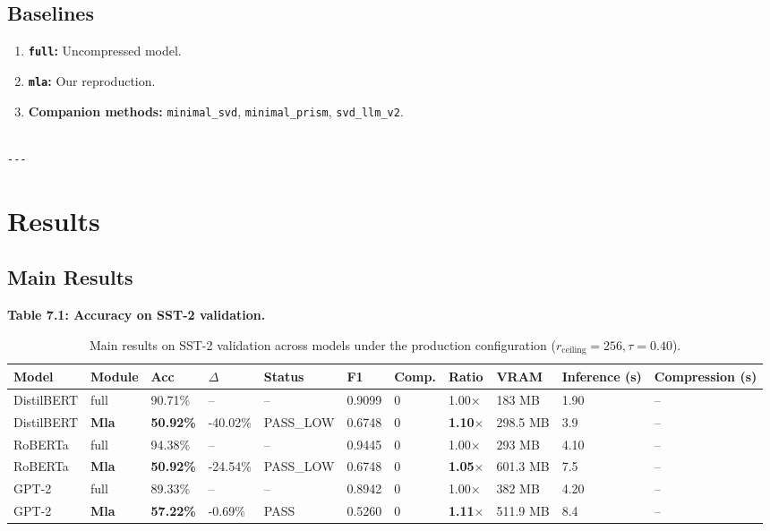 \subsection{Baselines}

\begin{enumerate}
\item \textbf{\texttt{full}:} Uncompressed model.
\item \textbf{\texttt{mla}:} Our reproduction.
\item \textbf{Companion methods:} \texttt{minimal\_svd}, \texttt{minimal\_prism}, \texttt{svd\_llm\_v2}.
\end{enumerate}
\begin{lstlisting}

---
\end{lstlisting}


\section{Results}

\subsection{Main Results}

\textbf{Table 7.1: Accuracy on SST-2 validation.}

\begin{table}[t]
\centering
\small
\begin{tabular}{lllllllllll}
\toprule
\textbf{Model} & \textbf{Module} & \textbf{Acc} & \textbf{$\Delta$} & \textbf{Status} & \textbf{F1} & \textbf{Comp.} & \textbf{Ratio} & \textbf{VRAM} & \textbf{Inference (s)} & \textbf{Compression (s)} \\
\midrule
DistilBERT & full & 90.71\% & -- & -- & 0.9099 & 0 & 1.00$\times$ & 183 MB & 1.90 & -- \\
DistilBERT & \textbf{Mla} & \textbf{50.92\%} & -40.02\% & PASS\_LOW & 0.6748 & 0 & \textbf{1.10$\times$} & 298.5 MB & 3.9 & -- \\
RoBERTa & full & 94.38\% & -- & -- & 0.9445 & 0 & 1.00$\times$ & 293 MB & 4.10 & -- \\
RoBERTa & \textbf{Mla} & \textbf{50.92\%} & -24.54\% & PASS\_LOW & 0.6748 & 0 & \textbf{1.05$\times$} & 601.3 MB & 7.5 & -- \\
GPT-2 & full & 89.33\% & -- & -- & 0.8942 & 0 & 1.00$\times$ & 382 MB & 4.20 & -- \\
GPT-2 & \textbf{Mla} & \textbf{57.22\%} & -0.69\% & PASS & 0.5260 & 0 & \textbf{1.11$\times$} & 511.9 MB & 8.4 & -- \\
\bottomrule
\end{tabular}
\caption{Main results on SST-2 validation across models under the production configuration ($r_{\mathrm{ceiling}}=256, \tau=0.40$).}
\label{tab:main_sst2}
\end{table}

